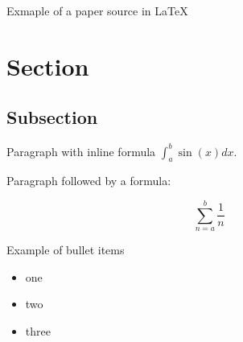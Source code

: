 

Exmaple of a paper source in LaTeX

\section{Section}

\subsection{Subsection}

Paragraph with inline formula $\int _a ^b \sin(x) dx$.

Paragraph followed by a formula:

$$\sum _{n=a} ^ b \frac{1}{n}$$

Example of bullet items

\begin{itemize}
\item one
\item two
\item three
\end{itemize}


